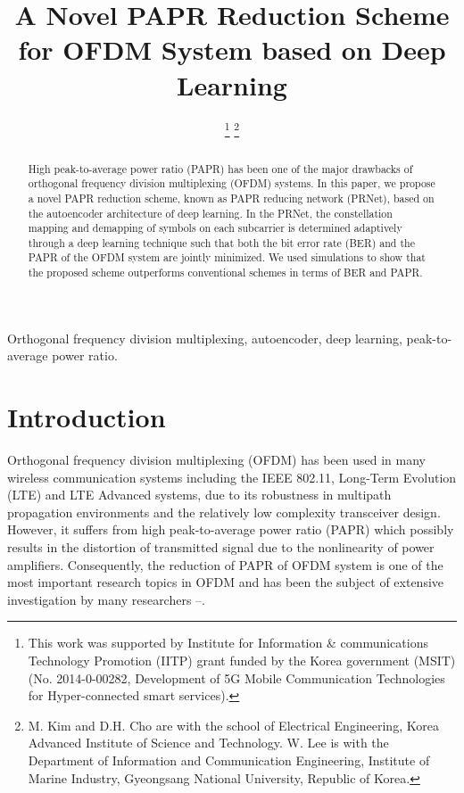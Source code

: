 \documentclass[journal]{IEEEtran}
\begin{document}
\title{A Novel PAPR Reduction Scheme for OFDM System based on Deep Learning}

\author{
\thanks{This work was supported by Institute for Information \& communications Technology Promotion (IITP) grant funded by the Korea government (MSIT) (No. 2014-0-00282, Development of 5G Mobile Communication Technologies for Hyper-connected smart services).}
\thanks{M. Kim and D.H. Cho are with the school of Electrical Engineering, Korea Advanced Institute of Science and Technology. W. Lee is with the Department of Information and Communication Engineering, Institute of Marine Industry, Gyeongsang National University, Republic of Korea.}
}

\maketitle

\begin{abstract}
High peak-to-average power ratio (PAPR) has been one of the major drawbacks of orthogonal frequency division multiplexing (OFDM) systems. In this paper, we propose a novel PAPR reduction scheme, known as PAPR reducing network (PRNet), based on the autoencoder architecture of deep learning. In the PRNet, the constellation mapping and demapping of symbols on each subcarrier is determined adaptively through a deep learning technique such that both the bit error rate (BER) and the PAPR of the OFDM system are jointly minimized. We used simulations to show that the proposed scheme outperforms conventional schemes in terms of BER and PAPR.
\end{abstract}

\begin{IEEEkeywords}
Orthogonal frequency division multiplexing, autoencoder, deep learning, peak-to-average power ratio.
\end{IEEEkeywords}

\section{Introduction}
Orthogonal frequency division multiplexing (OFDM) has been used in many wireless communication systems including the IEEE 802.11, Long-Term Evolution (LTE) and LTE Advanced systems, due to its robustness in multipath propagation environments and the relatively low complexity transceiver design. However, it suffers from high peak-to-average power ratio (PAPR) which possibly results in the distortion of transmitted signal due to the nonlinearity of power amplifiers. Consequently, the reduction of PAPR of OFDM system is one of the most important research topics in OFDM and has been the subject of extensive investigation by many researchers \cite{b1}--\cite{b4}.
\end{document}
